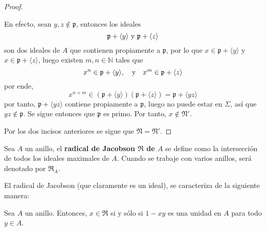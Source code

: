 \documentclass[12pt]{report}
\newcounter{it}
\theoremstyle{largebreak}
\begin{document}
\begin{proof}
\begin{itemize}
            En efecto, sean $y,z\notin\mathfrak{p}$, entonces los ideales
            \begin{equation*}
                \mathfrak{p}+\langle y\rangle\textup{ y }\mathfrak{p}+\langle z\rangle
            \end{equation*}
            son dos ideales de $A$ que contienen propiamente a $\mathfrak{p}$, por lo que $x\in\mathfrak{p}+\langle y\rangle$ y $x\in\mathfrak{p}+\langle z\rangle$, luego existen $m,n\in\mathbb{N}$ tales que
            \begin{equation*}
                x^n\in\mathfrak{p}+\langle y\rangle,\quad\textup{y}\quad x^m\in\mathfrak{p}+\langle z\rangle
            \end{equation*}
            por ende,
            \begin{equation*}
                x^{ n+m}\in\left(\mathfrak{p}+\langle y\rangle \right)\left(\mathfrak{p}+\langle z\rangle \right)=\mathfrak{p}+\langle yz\rangle
            \end{equation*}
            por tanto, $\mathfrak{p}+\langle yz\rangle$ contiene propiamente a $\mathfrak{p}$, luego no puede estar en $\Sigma$, así que $yz\notin\mathfrak{p}$. Se sigue entonces que $\mathfrak{p}$ es primo. Por tanto, $x\notin\mathfrak{N}'$.
        \end{itemize}
        Por los dos incisos anteriores se sigue que $\mathfrak{N}=\mathfrak{N}'$.
    \end{proof}

    \begin{mydef}
        Sea $A$ un anillo, el \textbf{radical de Jacobson $\mathfrak{R}$ de $A$} se define como la intersección de todos los ideales maximales de $A$. Cuando se trabaje con varios anillos, será denotado por $\mathfrak{R}_A$.
    \end{mydef}

    El radical de Jacobson (que claramente es un ideal), se caracteriza de la siguiente manera:

    \begin{propo}
        Sea $A$ un anillo. Entonces, $x\in\mathfrak{R}$ si y sólo si $1-xy$ es una unidad en $A$ para todo $y\in A$.
    \end{propo}
\end{document}
